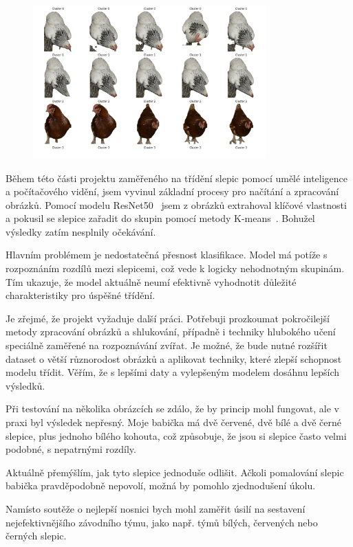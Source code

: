 \begin{figure}[H]
    \centering
    \includegraphics[width=0.8\textwidth]{img/chicks_in_clusters_2}
    \label{fig:chicks_in_clusters_2}
\end{figure}

Během této části projektu zaměřeného na třídění slepic pomocí umělé inteligence a počítačového vidění, jsem vyvinul základní procesy pro načítání a zpracování obrázků.
Pomocí modelu ResNet50~\cite{ResNet50Documentation} jsem z obrázků extrahoval klíčové vlastnosti a pokusil se slepice zařadit do skupin pomocí metody K-means~\cite{scikit-learnKMeans}.
Bohužel výsledky zatím nesplnily očekávání.

Hlavním problémem je nedostatečná přesnost klasifikace.
Model má potíže s rozpoznáním rozdílů mezi slepicemi, což vede k logicky nehodnotným skupinám.
Tím ukazuje, že model aktuálně neumí efektivně vyhodnotit důležité charakteristiky pro úspěšné třídění.

Je zřejmé, že projekt vyžaduje další práci.
Potřebuji prozkoumat pokročilejší metody zpracování obrázků a shlukování, případně i techniky hlubokého učení speciálně zaměřené na rozpoznávání zvířat.
Je možné, že bude nutné rozšířit dataset o větší různorodost obrázků a aplikovat techniky, které zlepší schopnost modelu třídit.
Věřím, že s lepšími daty a vylepšeným modelem dosáhnu lepších výsledků.

Při testování na několika obrázcích se zdálo, že by princip mohl fungovat, ale v praxi byl výsledek nepřesný.
Moje babička má dvě červené, dvě bílé a dvě černé slepice, plus jednoho bílého kohouta, což způsobuje, že jsou si slepice často velmi podobné, s nepatrnými rozdíly.

Aktuálně přemýšlím, jak tyto slepice jednoduše odlišit.
Ačkoli pomalování slepic babička pravděpodobně nepovolí, možná by pomohlo zjednodušení úkolu.

Namísto soutěže o nejlepší nosnici bych mohl zaměřit úsilí na sestavení nejefektivnějšího závodního týmu, jako např. týmů bílých, červených nebo černých slepic.





